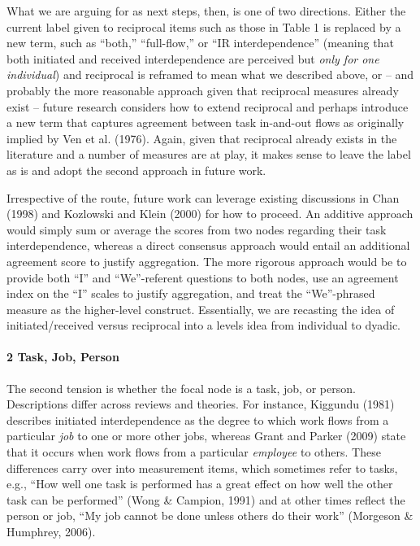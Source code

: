 \documentclass[english,,man]{apa6}
\let\oldparagraph\paragraph
\renewcommand{\paragraph}[1]{\oldparagraph{#1}\mbox{}}
\theoremstyle{definition}
\theoremstyle{definition}
\theoremstyle{definition}
\theoremstyle{remark}
\begin{document}
What we are arguing for as next steps, then, is one of two directions.
Either the current label given to reciprocal items such as those in
Table 1 is replaced by a new term, such as \enquote{both,}
\enquote{full-flow,} or \enquote{IR interdependence} (meaning that both
initiated and received interdependence are perceived but \emph{only for
one individual}) and reciprocal is reframed to mean what we described
above, or -- and probably the more reasonable approach given that
reciprocal measures already exist -- future research considers how to
extend reciprocal and perhaps introduce a new term that captures
agreement between task in-and-out flows as originally implied by Ven et
al. (1976). Again, given that reciprocal already exists in the
literature and a number of measures are at play, it makes sense to leave
the label as is and adopt the second approach in future work.

Irrespective of the route, future work can leverage existing discussions
in Chan (1998) and Kozlowski and Klein (2000) for how to proceed. An
additive approach would simply sum or average the scores from two nodes
regarding their task interdependence, whereas a direct consensus
approach would entail an additional agreement score to justify
aggregation. The more rigorous approach would be to provide both
\enquote{I} and \enquote{We}-referent questions to both nodes, use an
agreement index on the \enquote{I} scales to justify aggregation, and
treat the \enquote{We}-phrased measure as the higher-level construct.
Essentially, we are recasting the idea of initiated/received versus
reciprocal into a levels idea from individual to dyadic.

\hypertarget{task-job-person}{%
\paragraph{2 Task, Job, Person}\label{task-job-person}}

The second tension is whether the focal node is a task, job, or person.
Descriptions differ across reviews and theories. For instance, Kiggundu
(1981) describes initiated interdependence as the degree to which work
flows from a particular \emph{job} to one or more other jobs, whereas
Grant and Parker (2009) state that it occurs when work flows from a
particular \emph{employee} to others. These differences carry over into
measurement items, which sometimes refer to tasks, e.g., \enquote{How
well one task is performed has a great effect on how well the other task
can be performed} (Wong \& Campion, 1991) and at other times reflect the
person or job, \enquote{My job cannot be done unless others do their
work} (Morgeson \& Humphrey, 2006).
\end{document}
